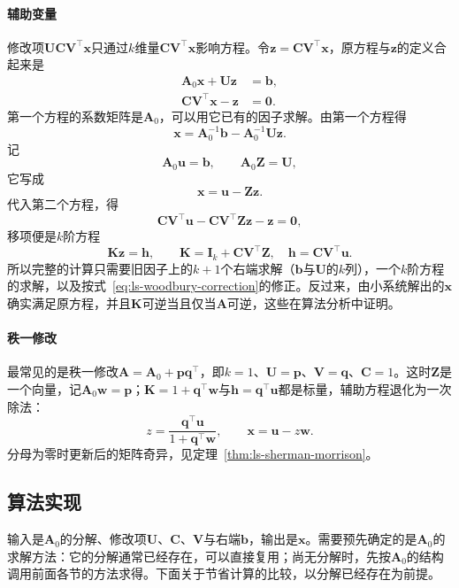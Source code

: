 \paragraph{辅助变量}
修改项$\bm U\bm C\bm V^\top\bm x$只通过$k$维量$\bm C\bm V^\top\bm x$影响方程。令$\bm z=\bm C\bm V^\top\bm x$，原方程与$\bm z$的定义合起来是
\[
 \begin{aligned}
 \bm A_0\bm x+\bm U\bm z&=\bm b,\\
 \bm C\bm V^\top\bm x-\bm z&=\bm0 .
 \end{aligned}
\]
第一个方程的系数矩阵是$\bm A_0$，可以用它已有的因子求解。由第一个方程得
\[
 \bm x=\bm A_0^{-1}\bm b-\bm A_0^{-1}\bm U\bm z .
\]
记
\begin{equation}
 \bm A_0\bm u=\bm b,\qquad \bm A_0\bm Z=\bm U,
 \label{eq:ls-woodbury-old-solves}
\end{equation}
它写成
\begin{equation}
 \bm x=\bm u-\bm Z\bm z .
 \label{eq:ls-woodbury-correction}
\end{equation}
代入第二个方程，得
\[
 \bm C\bm V^\top\bm u-\bm C\bm V^\top\bm Z\bm z-\bm z=\bm0 ,
\]
移项便是$k$阶方程
\begin{equation}
 \bm K\bm z=\bm h,\qquad
 \bm K=\bm I_k+\bm C\bm V^\top\bm Z,\quad
 \bm h=\bm C\bm V^\top\bm u .
 \label{eq:ls-woodbury-small-system}
\end{equation}
所以完整的计算只需要旧因子上的$k+1$个右端求解（$\bm b$与$\bm U$的$k$列），一个$k$阶方程的求解，以及按式~\eqref{eq:ls-woodbury-correction}的修正。反过来，由小系统解出的$\bm x$确实满足原方程，并且$\bm K$可逆当且仅当$\bm A$可逆，这些在算法分析中证明。

\paragraph{秩一修改}
最常见的是秩一修改$\bm A=\bm A_0+\bm p\bm q^\top$，即$k=1$、$\bm U=\bm p$、$\bm V=\bm q$、$\bm C=1$。这时$\bm Z$是一个向量，记$\bm A_0\bm w=\bm p$；$\bm K=1+\bm q^\top\bm w$与$\bm h=\bm q^\top\bm u$都是标量，辅助方程退化为一次除法：
\begin{equation}
 z=\frac{\bm q^\top\bm u}{1+\bm q^\top\bm w},\qquad \bm x=\bm u-z\bm w .
 \label{eq:ls-woodbury-rank-one-solve}
\end{equation}
分母为零时更新后的矩阵奇异，见定理~\ref{thm:ls-sherman-morrison}。

\subsection{算法实现}
输入是$\bm A_0$的分解、修改项$\bm U$、$\bm C$、$\bm V$与右端$\bm b$，输出是$\bm x$。需要预先确定的是$\bm A_0$的求解方法：它的分解通常已经存在，可以直接复用；尚无分解时，先按$\bm A_0$的结构调用前面各节的方法求得。下面关于节省计算的比较，以分解已经存在为前提。

